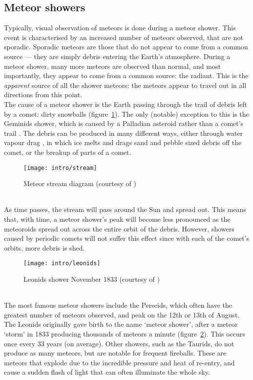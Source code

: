 \subsection{Meteor showers}
Typically, visual observation of meteors is done during a meteor shower. This event is characterised by an increased number of meteors observed, that are not sporadic. Sporadic meteors are those that do not appear to come from a common source --- they are simply debris entering the Earth's atmosphere. During a meteor shower, many more meteors are observed than normal, and most importantly, they appear to come from a common source: the radiant. This is the {\it apparent} source of all the shower meteors: the meteors appear to travel out in all directions from this point.\\
The cause of a meteor shower is the Earth passing through the trail of debris left by a comet: dirty snowballs (figure~\ref{streamfig}). The only (notable) exception to this is the Geminids shower, which is caused by a Palladian asteroid rather than a comet's trail \cite{palladian}. The debris can be produced in many different ways, either through water vapour drag \cite{watervapour}, in which ice melts and drags sand and pebble sized debris off the comet, or the breakup of parts of a comet.\\
\begin{figure}[h!]
	\centering
	\texttt{[image: intro/stream]}
	\caption{Meteor stream diagram (courtesy of \cite{stream})}
	\label{streamfig}
\end{figure}\\
As time passes, the stream will pass around the Sun and spread out. This means that, with time, a meteor shower's peak will become less pronounced as the meteoroids spread out across the entire orbit of the debris. However, showers caused by periodic comets will not suffer this effect since with each of the comet's orbits, more debris is shed.\\
\begin{figure}
	\centering
	\texttt{[image: intro/leonids]}
	\caption{Leonids shower November 1833 (courtesy of \cite{leonids})}
	\label{fig:1833leonids}
\end{figure}\\
The most famous meteor showers include the Perseids, which often have the greatest number of meteors observed, and peak on the 12th or 13th of August. The Leonids originally gave birth to the name `meteor shower',  after a meteor `storm' in 1833 producing thousands of meteors a minute (figure~\ref{fig:1833leonids}).
This occurs once every 33 years (on average). Other showers, such as the Taurids, do not produce as many meteors, but are notable for frequent fireballs. These are meteors that explode due to the incredible pressure and heat of re-entry, and cause a sudden flash of light that can often illuminate the whole sky.


